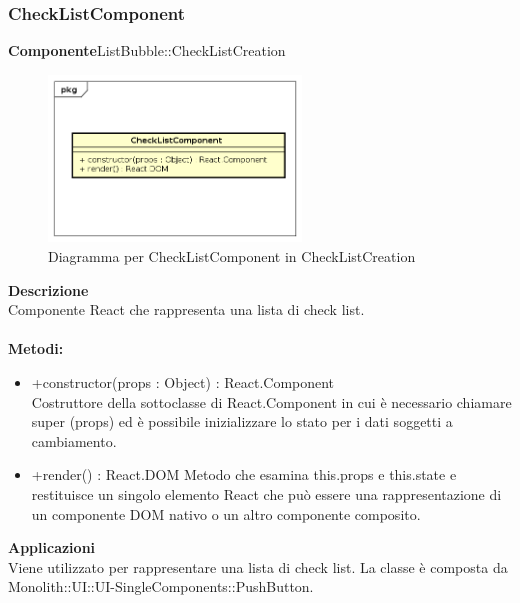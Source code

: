 \clearpage

\subsubsection{CheckListComponent}
\textbf{Componente}ListBubble::CheckListCreation\\
   \FloatBarrier
   \begin{figure}[ht]
   \centering
   \includegraphics[width=0.6\textwidth]{img/single-CheckListComponent}
   \caption{{Diagramma per CheckListComponent in CheckListCreation}}
\end{figure}
\FloatBarrier
\textbf{Descrizione}\\
Componente React che rappresenta una lista di check list.
\\
\\
\textbf{Metodi:} 
\begin{itemize}
\item +constructor(props : Object) : React.Component 
\\
Costruttore della sottoclasse di React.Component in cui è necessario chiamare super (props) ed è possibile inizializzare lo stato per i dati soggetti a cambiamento.

\item +render() : React.DOM
Metodo che esamina this.props e this.state e restituisce un singolo elemento React che può essere una rappresentazione di un componente DOM nativo o un altro componente composito.

\end{itemize} 


\textbf{Applicazioni}\\
Viene utilizzato per rappresentare una lista di check list.
La classe è composta da Monolith::UI::UI-SingleComponents::PushButton. 


\clearpage

